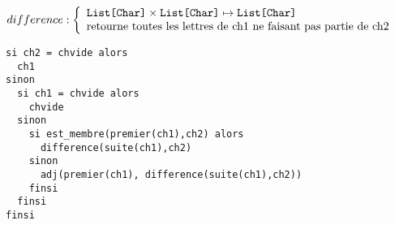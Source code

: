 \documentclass[10pt]{article}\usepackage[correction,nu]{esial}
\begin{document}
\begin{Question}
  $difference: \left\{
    \begin{array}{l}
      \text{\texttt{List[Char]}}\times \text{\texttt{List[Char]}}\mapsto \text{\texttt{List[Char]}}\\
      \text{retourne toutes les lettres de ch1 ne faisant
        pas partie de ch2}
    \end{array}\right.$    
\end{Question}
\begin{Reponse}
  \begin{Verbatim}[label=difference(ch1\quotesinglbase ch2)]
si ch2 = chvide alors
  ch1
sinon 
  si ch1 = chvide alors
    chvide
  sinon
    si est_membre(premier(ch1),ch2) alors
      difference(suite(ch1),ch2)
    sinon
      adj(premier(ch1), difference(suite(ch1),ch2))
    finsi
  finsi
finsi    
  \end{Verbatim}
\end{Reponse}
\end{document}

